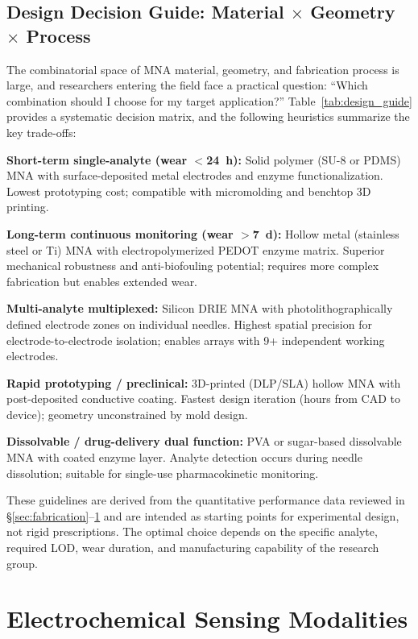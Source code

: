\documentclass[review,1p]{elsarticle}
\begin{document}
\subsection{Design Decision Guide: Material $\times$ Geometry $\times$ Process}
\label{subsec:design_guide}

The combinatorial space of MNA material, geometry, and fabrication process is large, and researchers entering the field face a practical question: ``Which combination should I choose for my target application?'' Table~\ref{tab:design_guide} provides a systematic decision matrix, and the following heuristics summarize the key trade-offs:

\textbf{Short-term single-analyte (wear $<$24~h):} Solid polymer (SU-8 or PDMS) MNA with surface-deposited metal electrodes and enzyme functionalization. Lowest prototyping cost; compatible with micromolding and benchtop 3D printing.

\textbf{Long-term continuous monitoring (wear $>$7~d):} Hollow metal (stainless steel or Ti) MNA with electropolymerized PEDOT enzyme matrix. Superior mechanical robustness and anti-biofouling potential; requires more complex fabrication but enables extended wear.

\textbf{Multi-analyte multiplexed:} Silicon DRIE MNA with photolithographically defined electrode zones on individual needles. Highest spatial precision for electrode-to-electrode isolation; enables arrays with 9+ independent working electrodes.

\textbf{Rapid prototyping / preclinical:} 3D-printed (DLP/SLA) hollow MNA with post-deposited conductive coating. Fastest design iteration (hours from CAD to device); geometry unconstrained by mold design.

\textbf{Dissolvable / drug-delivery dual function:} PVA or sugar-based dissolvable MNA with coated enzyme layer. Analyte detection occurs during needle dissolution; suitable for single-use pharmacokinetic monitoring.

These guidelines are derived from the quantitative performance data reviewed in §\ref{sec:fabrication}--\ref{sec:sensing} and are intended as starting points for experimental design, not rigid prescriptions. The optimal choice depends on the specific analyte, required LOD, wear duration, and manufacturing capability of the research group.


\section{Electrochemical Sensing Modalities}
\label{sec:sensing}
\end{document}
